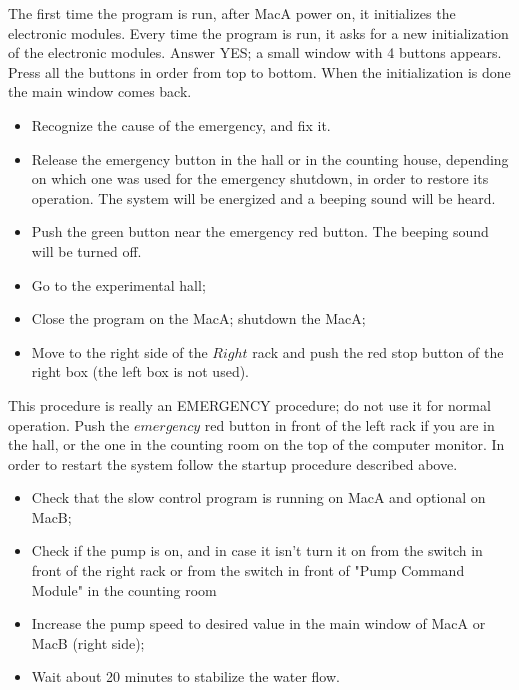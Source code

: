 The first time the program is run, after MacA power on, it initializes the
electronic modules. Every time the program is run, it asks for a new 
initialization of the electronic modules. Answer YES; a small window 
with 4 buttons appears. Press all the buttons  in order from top to bottom. 
When the initialization is done the main window comes back. \\


\begin{itemize}
  \item Recognize the cause of the emergency, and fix it.
  \item Release the emergency button in the hall or in the counting house, 
	depending on which one was used for the emergency shutdown, in order 
	to restore its operation. The system will be energized and a 
	beeping sound will be heard.
  \item Push the green button near the emergency red button. The beeping 
sound will be turned off.
\end{itemize}

 \vspace*{0.3cm}


\begin{itemize}
  \item Go to the experimental hall;
  \item Close the program on the MacA; shutdown the MacA;
  \item Move to the right side of the $Right$ rack and push the red 
stop button of the right box (the left box is not used).
\end{itemize}


This procedure is really an EMERGENCY procedure; do not use it for normal
operation.
 Push the $emergency$ red button in front of the left rack if you are in the
hall, or the one in the counting room on the top of the computer monitor.
In order to restart the system follow the startup procedure described above. \\


\begin{itemize}
\item Check that the slow control program is running on MacA and optional
	on MacB;
\item  Check if the pump is on, and in case it isn't 
	turn it on from the switch in 
	front of the right rack or from the  switch in front of
 	"Pump Command  Module" in the counting room 
\item Increase the pump speed to desired value in the main window of 
	MacA or MacB (right side); 
\item Wait about 20 minutes to stabilize the water flow.
\end{itemize}

